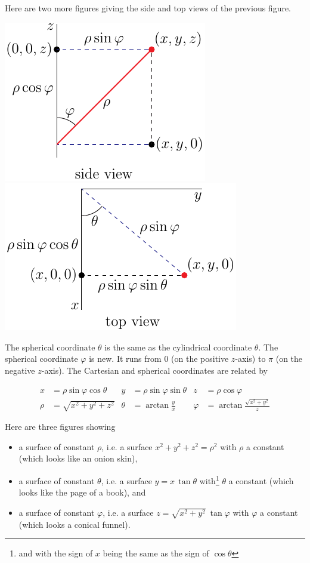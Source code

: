 Here are two more figures giving the side and top views of the 
previous figure.
\begin{efig}
\begin{center}
    \includegraphics{../figs_coord/sphericalSide.pdf}\qquad
    \includegraphics{../figs_coord/sphericalTop.pdf}\qquad
\end{center}
\end{efig}
The spherical coordinate $\theta$ is the same as the cylindrical coordinate
$\theta$. The spherical coordinate $\varphi$ is new. It runs from $0$
(on the positive $z$-axis) to $\pi$ (on the negative $z$-axis).
The Cartesian and spherical coordinates
are related by
\begin{impeqn}\label{eqn spherical}
\begin{align*}
x&=\rho\sin\varphi\cos\theta &
y&=\rho\sin\varphi\sin\theta &
z&=\rho\cos\varphi \\
 \rho&=\sqrt{x^2+y^2+z^2} &
 \theta&=\arctan\frac{y}{x} &
 \varphi&=\arctan\frac{\sqrt{x^2+y^2}}{z}
\end{align*}
\end{impeqn}
Here are three figures showing
\begin{itemize}
\item
a surface of constant $\rho$, i.e. a surface $x^2+y^2+z^2=\rho^2$
with $\rho$ a constant (which looks like an onion skin), 
\item
a surface of constant $\theta$, i.e. a surface $y= x\,\tan\theta$
with\footnote{and with the sign of $x$ being the same as the sign of $\cos\theta$} $\theta$ a constant (which looks like the page of a book), and 
\item
a surface of constant $\varphi$, i.e. a surface
$z=\sqrt{x^2+y^2}\ \tan\varphi$ with $\varphi$ a constant 
(which looks a conical funnel).
\end{itemize}
